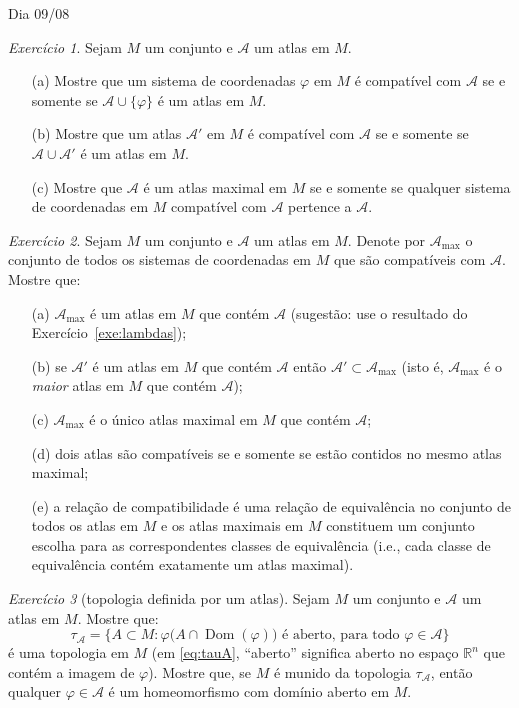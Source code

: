 \documentclass[oneside,11pt]{amsart}
\newcommand{\R}{\mathds R}
\DeclareMathOperator{\Dom}{Dom}
\theoremstyle{remark}\newtheorem{exercise}{Exercício}[section]
\theoremstyle{plain}\newtheorem{teo}{Teorema}[section]
\theoremstyle{plain}\newtheorem{lem}[teo]{Lema}
\theoremstyle{plain}\newtheorem{prop}[teo]{Proposição}
\theoremstyle{definition}\newtheorem{defin}[teo]{Definição}
\theoremstyle{remark}\newtheorem{rem}[teo]{Observação}
\theoremstyle{definition}\newtheorem{example}[teo]{Exemplo}
\numberwithin{equation}{section}
\begin{document}
\begin{section}{Dia 09/08}
\begin{exercise}
Sejam $M$ um conjunto e $\mathcal A$ um atlas em $M$.
\begin{itemize}
\item[(a)] Mostre que um sistema de coordenadas $\varphi$ em $M$ é compatível com $\mathcal A$ se e somente se $\mathcal A\cup\{\varphi\}$ é um atlas
em $M$.
\item[(b)] Mostre que um atlas $\mathcal A'$ em $M$ é compatível com $\mathcal A$ se e somente se $\mathcal A\cup\mathcal A'$ é um atlas em $M$.
\item[(c)] Mostre que $\mathcal A$ é um atlas maximal em $M$ se e somente se qualquer sistema de coordenadas
em $M$ compatível com $\mathcal A$ pertence a $\mathcal A$.
\end{itemize}
\end{exercise}

\begin{exercise}
Sejam $M$ um conjunto e $\mathcal A$ um atlas em $M$. Denote por $\mathcal A_{\max}$ o conjunto de todos os sistemas de coordenadas em $M$ que são compatíveis
com $\mathcal A$. Mostre que:
\begin{itemize}
\item[(a)] $\mathcal A_{\max}$ é um atlas em $M$ que contém $\mathcal A$ (sugestão: use o resultado do Exercício~\ref{exe:lambdas});
\item[(b)] se $\mathcal A'$ é um atlas em $M$ que contém $\mathcal A$ então $\mathcal A'\subset\mathcal A_{\max}$ (isto é, $\mathcal A_{\max}$ é o
{\em maior\/} atlas em $M$ que contém $\mathcal A$);
\item[(c)] $\mathcal A_{\max}$ é o único atlas maximal em $M$ que contém $\mathcal A$;
\item[(d)] dois atlas são compatíveis se e somente se estão contidos no mesmo atlas maximal;
\item[(e)] a relação de compatibilidade é uma relação de equivalência no conjunto de todos os atlas em $M$ e os atlas maximais
em $M$ constituem um conjunto escolha para as correspondentes classes de equivalência (i.e., cada classe de equivalência contém exatamente
um atlas maximal).
\end{itemize}
\end{exercise}

\begin{exercise}[topologia definida por um atlas]
Sejam $M$ um conjunto e $\mathcal A$ um atlas em $M$. Mostre que:
\begin{equation}\label{eq:tauA}
\tau_{\mathcal A}=\big\{A\subset M:\text{$\varphi\big(A\cap\Dom(\varphi)\big)$ é aberto, para todo $\varphi\in\mathcal A$}\big\}
\end{equation}
é uma topologia em $M$ (em \eqref{eq:tauA}, ``aberto'' significa aberto no espaço $\R^n$ que contém a imagem de $\varphi$).
Mostre que, se $M$ é munido da topologia $\tau_{\mathcal A}$, então qualquer $\varphi\in\mathcal A$ é um homeomorfismo
com domínio aberto em $M$.
\end{exercise}


\end{section}
\end{document}
